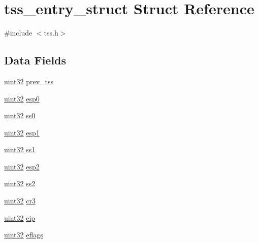 \hypertarget{structtss__entry__struct}{
\section{tss\_\-entry\_\-struct Struct Reference}
\label{structtss__entry__struct}
}


{\ttfamily \#include $<$tss.h$>$}

\subsection*{Data Fields}
\begin{DoxyCompactItemize}
\item 
\hyperlink{int__types_8h_a1134b580f8da4de94ca6b1de4d37975e}{uint32} \hyperlink{structtss__entry__struct_a3d76ec9b8a326367d5c988609068e781}{prev\_\-tss}
\item 
\hyperlink{int__types_8h_a1134b580f8da4de94ca6b1de4d37975e}{uint32} \hyperlink{structtss__entry__struct_aee7097d415e95eebdcf56a19cd8e9740}{esp0}
\item 
\hyperlink{int__types_8h_a1134b580f8da4de94ca6b1de4d37975e}{uint32} \hyperlink{structtss__entry__struct_a3aaba70789b616330d717224fe1e3166}{ss0}
\item 
\hyperlink{int__types_8h_a1134b580f8da4de94ca6b1de4d37975e}{uint32} \hyperlink{structtss__entry__struct_a52ea7f14f2f312e71ebafe879a171726}{esp1}
\item 
\hyperlink{int__types_8h_a1134b580f8da4de94ca6b1de4d37975e}{uint32} \hyperlink{structtss__entry__struct_a787088e6043f61a03622b25ef1816e51}{ss1}
\item 
\hyperlink{int__types_8h_a1134b580f8da4de94ca6b1de4d37975e}{uint32} \hyperlink{structtss__entry__struct_a146fdb1a95ce3161160577904c01dd79}{esp2}
\item 
\hyperlink{int__types_8h_a1134b580f8da4de94ca6b1de4d37975e}{uint32} \hyperlink{structtss__entry__struct_a64f26bd76bf74688d440c1d7ae06a286}{ss2}
\item 
\hyperlink{int__types_8h_a1134b580f8da4de94ca6b1de4d37975e}{uint32} \hyperlink{structtss__entry__struct_a9e0f9b972f132d019c51e1f4293f91f6}{cr3}
\item 
\hyperlink{int__types_8h_a1134b580f8da4de94ca6b1de4d37975e}{uint32} \hyperlink{structtss__entry__struct_ab491c598aa828380e118d261c303fde0}{eip}
\item 
\hyperlink{int__types_8h_a1134b580f8da4de94ca6b1de4d37975e}{uint32} \hyperlink{structtss__entry__struct_af59ddcc0e4d8170bf69cfb0f1b430984}{eflags}

\end{DoxyCompactItemize}
